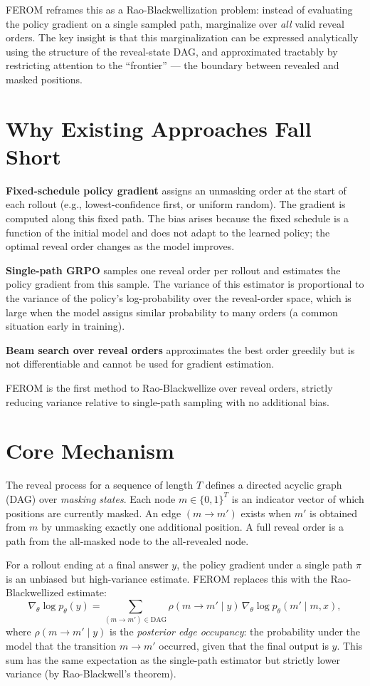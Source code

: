 \documentclass[10pt,twocolumn]{article}
\begin{document}
FEROM reframes this as a Rao-Blackwellization problem: instead of evaluating
the policy gradient on a single sampled path, marginalize over \emph{all} valid
reveal orders. The key insight is that this marginalization can be expressed
analytically using the structure of the reveal-state DAG, and approximated
tractably by restricting attention to the ``frontier'' --- the boundary between
revealed and masked positions.

\section{Why Existing Approaches Fall Short}

\textbf{Fixed-schedule policy gradient} assigns an unmasking order at the start
of each rollout (e.g., lowest-confidence first, or uniform random). The
gradient is computed along this fixed path. The bias arises because the fixed
schedule is a function of the initial model and does not adapt to the learned
policy; the optimal reveal order changes as the model improves.

\textbf{Single-path GRPO} samples one reveal order per rollout and estimates the
policy gradient from this sample. The variance of this estimator is proportional
to the variance of the policy's log-probability over the reveal-order space,
which is large when the model assigns similar probability to many orders (a
common situation early in training).

\textbf{Beam search over reveal orders} approximates the best order greedily
but is not differentiable and cannot be used for gradient estimation.

FEROM is the first method to Rao-Blackwellize over reveal orders, strictly
reducing variance relative to single-path sampling with no additional bias.

\section{Core Mechanism}

The reveal process for a sequence of length $T$ defines a directed acyclic graph
(DAG) over \emph{masking states}. Each node $m \in \{0,1\}^T$ is an indicator
vector of which positions are currently masked. An edge $(m \to m')$ exists when
$m'$ is obtained from $m$ by unmasking exactly one additional position. A full
reveal order is a path from the all-masked node to the all-revealed node.

For a rollout ending at a final answer $y$, the policy gradient under a single
path $\pi$ is an unbiased but high-variance estimate. FEROM replaces this with
the Rao-Blackwellized estimate:
\[
  \nabla_\theta \log p_\theta(y) = \sum_{(m \to m')\in\text{DAG}}
    \rho(m \to m' \mid y)\, \nabla_\theta \log p_\theta(m' \mid m, x),
\]
where $\rho(m \to m' \mid y)$ is the \emph{posterior edge occupancy}: the
probability under the model that the transition $m \to m'$ occurred, given that
the final output is $y$. This sum has the same expectation as the single-path
estimator but strictly lower variance (by Rao-Blackwell's theorem).
\end{document}
